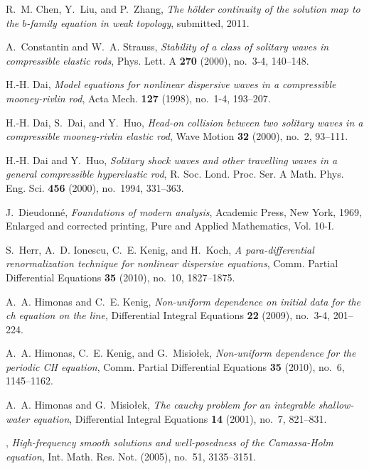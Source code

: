 \documentclass[final,noinfo]{thesis}
\begin{document}
\begin{thebibliography}{100}
R.~M. Chen, Y.~Liu, and P.~Zhang, \emph{The h\"{o}lder continuity of the
  solution map to the $b$-family equation in weak topology}, submitted, 2011.

A.~Constantin and W.~A. Strauss, \emph{Stability of a class of solitary waves
  in compressible elastic rods}, Phys. Lett. A \textbf{270} (2000), no.~3-4,
  140--148.

H.-H. Dai, \emph{Model equations for nonlinear dispersive waves in a
  compressible mooney-rivlin rod}, Acta Mech. \textbf{127} (1998), no.~1-4,
  193--207.

H.-H. Dai, S.~Dai, and Y.~Huo, \emph{Head-on collision between two solitary
  waves in a compressible mooney-rivlin elastic rod}, Wave Motion \textbf{32}
  (2000), no.~2, 93--111.

H.-H. Dai and Y.~Huo, \emph{Solitary shock waves and other travelling waves in
  a general compressible hyperelastic rod}, R. Soc. Lond. Proc. Ser. A Math.
  Phys. Eng. Sci. \textbf{456} (2000), no.~1994, 331--363.

J.~Dieudonn{{\'e}}, \emph{Foundations of modern analysis}, Academic Press, New
  York, 1969, Enlarged and corrected printing, Pure and Applied Mathematics,
  Vol. 10-I. 

S.~Herr, A.~D. Ionescu, C.~E. Kenig, and H.~Koch, \emph{A para-differential
  renormalization technique for nonlinear dispersive equations}, Comm. Partial
  Differential Equations \textbf{35} (2010), no.~10, 1827--1875.

A.~A. Himonas and C.~E. Kenig, \emph{Non-uniform dependence on initial data for
  the ch equation on the line}, Differential Integral Equations \textbf{22}
  (2009), no.~3-4, 201--224.

A.~A. Himonas, C.~E. Kenig, and G.~Misio{\l}ek, \emph{Non-uniform dependence
  for the periodic {CH} equation}, Comm. Partial Differential Equations
  \textbf{35} (2010), no.~6, 1145--1162. 

A.~A. Himonas and G.~Misio{\l}ek, \emph{The cauchy problem for an integrable
  shallow-water equation}, Differential Integral Equations \textbf{14} (2001),
  no.~7, 821--831.

\bysame, \emph{High-frequency smooth solutions and
  well-posedness of the {C}amassa-{H}olm equation}, Int. Math. Res. Not.
  (2005), no.~51, 3135--3151. 


\end{thebibliography}
\end{document}
